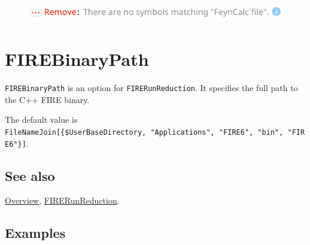\documentclass[../FeynHelpersManual.tex]{subfiles}
\begin{document}
\FloatBarrier
\begin{figure}[!ht]
\centering
\includegraphics[width=0.6\linewidth]{img/1klto42084vx8.pdf}
\end{figure}
\FloatBarrier

\begin{Shaded}
\begin{Highlighting}[]
 
\end{Highlighting}
\end{Shaded}

\hypertarget{firebinarypath}{
\section{FIREBinaryPath}\label{firebinarypath}}

\texttt{FIREBinaryPath} is an option for \texttt{FIRERunReduction}. It
specifies the full path to the C++ FIRE binary.

The default value is
\texttt{FileNameJoin[\allowbreak{}\{\allowbreak{}\$UserBaseDirectory,\ \allowbreak{}"Applications",\ \allowbreak{}"FIRE6",\ \allowbreak{}"bin",\ \allowbreak{}"FIRE6"\}]}.

\subsection{See also}

\hyperlink{toc}{Overview},
\hyperlink{firerunreduction}{FIRERunReduction}.

\subsection{Examples}
\end{document}
